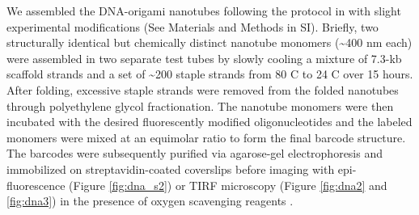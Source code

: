 We assembled the DNA-origami nanotubes following the protocol in \citep{douglas_dna-nanotube-induced_2007} with slight experimental modifications (See Materials and Methods in SI). 
Briefly, two structurally identical but chemically distinct nanotube monomers (\textasciitilde400 nm 
each) were assembled in two separate test tubes by slowly cooling a mixture of 7.3-kb 
scaffold strands and a set of \textasciitilde200 staple strands from 80 \textdegree C to 24 \textdegree C over 15 hours. After 
folding, excessive staple strands were removed from the folded nanotubes through 
polyethylene glycol fractionation. The nanotube monomers were then incubated with the 
desired fluorescently modified oligonucleotides and the labeled monomers were mixed at 
an equimolar ratio to form the final barcode structure. The barcodes were subsequently 
purified via agarose-gel electrophoresis and immobilized on streptavidin-coated 
coverslips before imaging with epi-fluorescence (Figure \ref{fig:dna_s2}) or TIRF microscopy (Figure 
\ref{fig:dna2} and \ref{fig:dna3}) in the presence of oxygen scavenging reagents \citep{liedl_self-assembly_2010}. 

